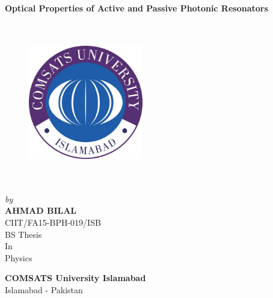 \documentclass[12pt,twoside]{report}
\begin{document}
	\begin{center}
		
		\Large \textbf{Optical Properties of Active and Passive Photonic Resonators}
		
	\end{center}
\begin{center}
	\begin{figure}[h]
	\centering
	\includegraphics[width=5cm,height=7cm,keepaspectratio]{universitye.jpg}\\
	\end{figure}
\end{center}
	\begin{center}
		\emph{\large by}\\
		
		\Large \textbf{AHMAD BILAL}\\
		\Large CIIT/FA15-BPH-019/ISB\\
		\vfill
		\Large BS Thesis\\
		\Large In\\
		\Large Physics
	\end{center}
	\vfill
	\begin{center}
		\Large \textbf{COMSATS University Islamabad}\\
		\Large Islamabad - Pakistan
	\end{center}
	
\end{document}
